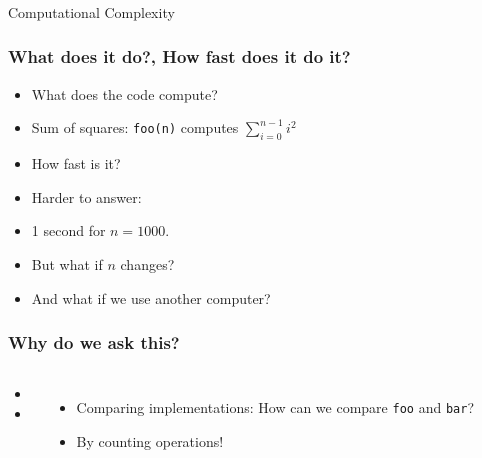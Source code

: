 \begin{frame}[fragile]\frametitle{}
\begin{center}
{\Large Computational Complexity}
\end{center}

\end{frame}

\begin{frame}
	\frametitle{What does it do?, How fast does it do it?}

		
			\begin{itemize}
			\item What does the code compute?
			\item Sum of squares: \texttt{foo(n)} computes $\sum\limits_{i=0}^{n-1} i^2$
			\item How fast is it?
			\item Harder to answer:
			\item 1 second for $n=1000$.
			\item But what if $n$ changes?
			\item And what if we use another computer?
	\end{itemize}
	
		
	
\end{frame}

\begin{frame}
	\frametitle{Why do we ask this?}

	\begin{columns}
			\begin{itemize}
			\item 
			
			\item 
	\end{itemize}
			
		
			\begin{itemize}
			\item Comparing implementations: 	How can we compare \texttt{foo} and \texttt{bar}?
			\item By counting operations!
		\end{itemize}
	\end{columns}
\end{frame}

